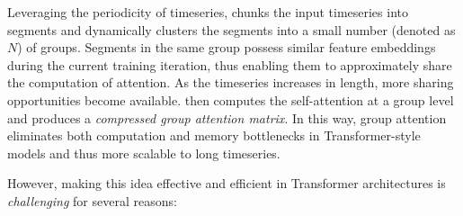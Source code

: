 Leveraging the periodicity of timeseries, \system chunks the input timeseries into segments and dynamically clusters the segments into a small number (denoted as $N$) of groups. Segments in the same group possess similar feature embeddings during the current training iteration, thus enabling them to approximately share the computation of attention. As the timeseries increases in length, more sharing opportunities become available. \system then computes the self-attention at a group level and produces a {\it compressed group attention matrix}.
In this way, group attention eliminates both computation and memory bottlenecks in Transformer-style models and thus more scalable to long timeseries.

However, making this idea effective and efficient in Transformer architectures is {\it challenging} for several reasons:

